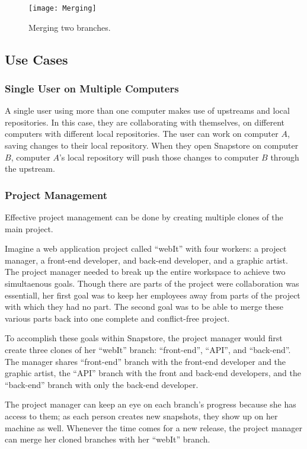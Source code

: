 \begin{figure}
\texttt{[image: Merging]}
\caption{Merging two branches.}
\label{arm:fig1}
\end{figure}

\subsection{Use Cases}

\subsubsection{Single User on Multiple Computers}

A single user using more than one computer makes use of upstreams and local repositories. In this case, they are collaborating with themselves, on different computers with different local repositories. The user can work on computer $A$, saving changes to their local repository. When they open Snapstore on computer $B$, computer $A$'s local repository will push those changes to computer $B$ through the upstream.

\subsubsection{Project Management}

Effective project management can be done by creating multiple clones of the main project.

Imagine a web application project called ``webIt'' with four workers: a project manager, a front-end developer, and back-end developer, and a graphic artist. The project manager needed to break up the entire workspace to achieve two simultaenous goals. Though there are parts of the project were collaboration was essentiall, her first goal was to keep her employees away from parts of the project with which they had no part. The second goal was to be able to merge these various parts back into one complete and conflict-free project.

To accomplish these goals within Snapstore, the project manager would first create three clones of her ``webIt'' branch: ``front-end'', ``API'', and ``back-end''. The manager shares ``front-end'' branch with the front-end developer and the graphic artist, the ``API'' branch with the front and back-end developers, and the ``back-end'' branch with only the back-end developer. 

The project manager can keep an eye on each branch's progress because she has access to them; as each person creates new snapshots, they show up on her machine as well. Whenever the time comes for a new release, the project manager can merge her cloned branches with her ``webIt'' branch. 

